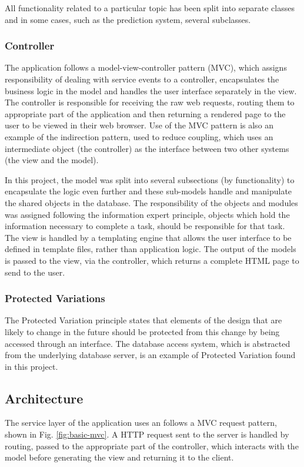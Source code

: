 All functionality related to a particular topic has been split into separate classes and in some cases, such as the prediction system, several subclasses.

\subsubsection{Controller}
The application follows a model-view-controller pattern (MVC), which assigns responsibility of dealing with service events to a controller, encapsulates the business logic in the model and handles the user interface separately in the view. The controller is responsible for receiving the raw web requests, routing them to appropriate part of the application and then returning a rendered page to the user to be viewed in their web browser. Use of the MVC pattern is also an example of the indirection pattern, used to reduce coupling, which uses an intermediate object (the controller) as the interface between two other systems (the view and the model).

In this project, the model was split into several subsections (by functionality) to encapsulate the logic even further and these sub-models handle and manipulate the shared objects in the database. The responsibility of the objects and modules was assigned following the information expert principle, objects which hold the information necessary to complete a task, should be responsible for that task. The view is handled by a templating engine that allows the user interface to be defined in template files, rather than application logic. The output of the models is passed to the view, via the controller, which returns a complete HTML page to send to the user.

\subsubsection{Protected Variations}
The Protected Variation principle states that elements of the design that are likely to change in the future should be protected from this change by being accessed through an interface. The database access system, which is abstracted from the underlying database server, is an example of Protected Variation found in this project.

\subsection{Architecture}
The service layer of the application uses an follows a MVC request pattern, shown in Fig. \ref{fig:basic-mvc}. A HTTP request sent to the server is handled by routing, passed to the appropriate part of the controller, which interacts with the model before generating the view and returning it to the client. 

